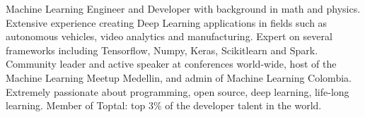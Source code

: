 \small{Machine Learning Engineer and Developer with background in math and physics. Extensive experience 
creating Deep Learning applications in fields such as autonomous vehicles, video analytics and manufacturing. 
Expert on several frameworks including Tensorflow, Numpy, Keras, Scikitlearn and Spark. Community leader and active 
speaker at conferences world-wide, host of the Machine Learning Meetup Medellin, and admin of Machine Learning 
Colombia. Extremely passionate about programming, open source, deep learning, life-long learning. 
Member of Toptal: top 3\% of the developer talent in the world.}
